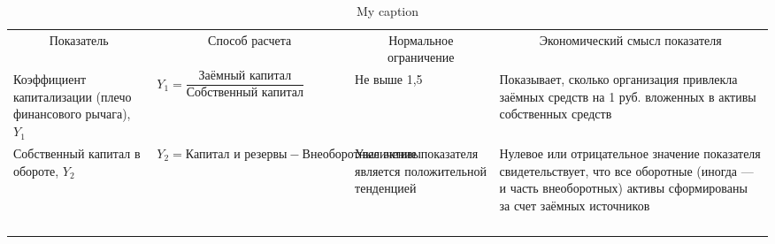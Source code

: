 \begin{longtable}{ l{4cm} | l{4cm}| l{4cm}| l{4cm} }
	\small
	\caption{My caption}
	\label{my-label}\\
	\hline
	\multicolumn{1}{|c|}{Показатель}                            & \multicolumn{1}{c|}{Способ расчета}                                & \multicolumn{1}{c|}{Нормальное ограничение}             & \multicolumn{1}{c|}{Экономический смысл показателя}                                                                                                               \\ \hline
	\endfirsthead
	\endhead
	Коэффициент капитализации (плечо финансового рычага), $Y_1$ & $Y_1 = \dfrac{\text{Заёмный капитал}}{\text{Собственный капитал}}$ & Не выше 1,5                                             & Показывает, сколько организация привлекла заёмных средств на 1 руб. вложенных в активы собственных средств                                                        \\ \hline
	Собственный капитал в обороте, $Y_2$                        & $Y_2 = \text{Капитал и резервы} - \text{Внеоборотные активы}$      & Увеличение показателя является положительной тенденцией & Нулевое или отрицательное значение показателя свидетельствует, что все оборотные (иногда --- и часть внеоборотных) активы сформированы за счет заёмных источников \\ \hline
	&                                                                    &                                                         &                                                                                                                                                                   \\ \hline
	&                                                                    &                                                         &                                                                                                                                                                   \\ \hline
	&                                                                    &                                                         &                                                                                                                                                                   \\ \hline
	&                                                                    &                                                         &                                                                                                                                                                   \\ \hline

\end{longtable}
